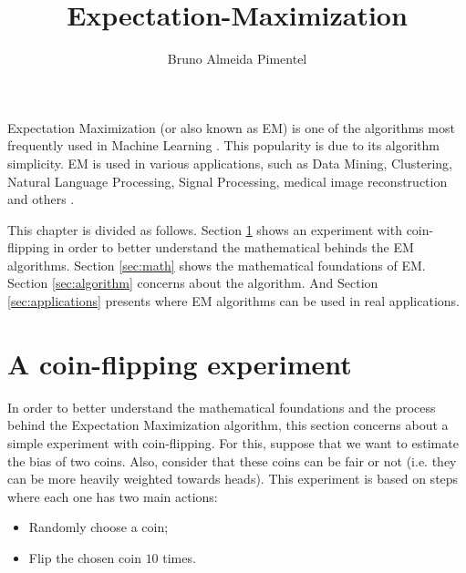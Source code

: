 \title{Expectation-Maximization}
\label{chp:expectation-maximization}
\author{Bruno Almeida Pimentel}
\maketitle



Expectation Maximization (or also known as EM) is one of the algorithms most frequently used in Machine Learning \cite{moon1996expectation, do2008expectation}. This popularity is due to its algorithm simplicity. EM is used in various applications, such as Data Mining, Clustering, Natural Language Processing, Signal Processing,  medical image reconstruction and others \cite{dellaert2002expectation, dempster1977maximum, ceppellini1955estimation, tzoreff2017expectation, li2019expectation}.

This chapter is divided as follows. Section \ref{sec:coin} shows an experiment with coin-flipping in order to better understand the mathematical behinds the EM algorithms. Section \ref{sec:math} shows the mathematical foundations of EM. Section \ref{sec:algorithm} concerns about the algorithm. And Section \ref{sec:applications} presents where EM algorithms can be used in real applications. 

\section{A coin-flipping experiment}
\label{sec:coin}

In order to better understand the mathematical foundations and the process behind the Expectation Maximization algorithm, this section concerns about a simple experiment with coin-flipping. For this, suppose that we want to estimate the bias of two coins. Also, consider that these coins can be fair or not (i.e. they can be more heavily weighted towards heads). This experiment is based on steps where each one has two main actions:

\begin{itemize}
    \item Randomly choose a coin;
    \item Flip the chosen coin $10$ times.
\end{itemize}

